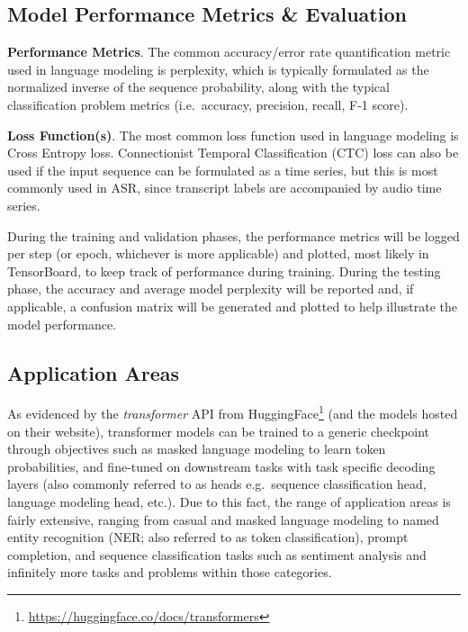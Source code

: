 \documentclass[10pt]{article}
\begin{document}
        \subsection{Model Performance Metrics \& Evaluation}
        \textbf{Performance Metrics}.
        The common accuracy/error rate quantification metric used in language modeling is perplexity, which is typically formulated as
        the normalized inverse of the sequence probability, along with the typical classification problem metrics (i.e.~accuracy,
        precision, recall, F-1 score).


        \textbf{Loss Function(s)}.
        The most common loss function used in language modeling is Cross Entropy loss. Connectionist Temporal Classification (CTC) loss
        can also be used if the input sequence can be formulated as a time series, but this is most commonly used in ASR, since
        transcript labels are accompanied by audio time series.


        During the training and validation phases, the performance metrics will be logged per step (or epoch, whichever is more
        applicable) and plotted, most likely in TensorBoard, to keep track of performance during training. During the testing phase,
        the accuracy and average model perplexity will be reported and, if applicable, a confusion matrix will be generated and plotted
        to help illustrate the model performance.


        \subsection{Application Areas}
        As evidenced by the \textit{transformer} API from HuggingFace\footnote{\url{https://huggingface.co/docs/transformers}} (and the models hosted
        on their website), transformer models can be trained to a generic checkpoint through objectives such as masked language modeling to learn
        token probabilities, and fine-tuned on downstream tasks with task specific decoding layers (also commonly referred to as heads
        e.g.~sequence classification head, language modeling head, etc.). Due to this fact, the range of application areas is fairly
        extensive, ranging from casual and masked language modeling to named entity recognition (NER; also referred to as token
        classification), prompt completion, and sequence classification tasks such as sentiment analysis and infinitely more tasks and
        problems within those categories.
\end{document}

